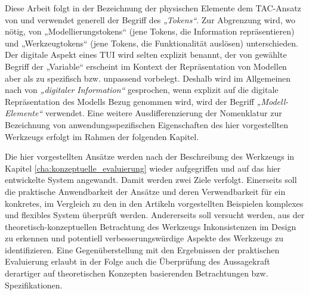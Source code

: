 % 	

Diese Arbeit folgt in der Bezeichnung der physischen Elemente dem TAC-Ansatz von \citep{Shaer04} und verwendet generell der Begriff des \emph{„Tokens“}. Zur Abgrenzung wird, wo nötig, von „Modellierungstokens“ (jene Tokens, die Information repräsentieren) und „Werkzeugtokens“ (jene Tokens, die Funktionalität auslösen) unterschieden. Der digitale Aspekt eines \gls{TUI} wird selten explizit benannt, der von \citep{Shaer04} gewählte Begriff der „Variable“ erscheint im Kontext der Repräsentation von Modellen aber als zu spezifisch bzw. unpassend vorbelegt. Deshalb wird im Allgemeinen nach \citep{Ishii08} von \emph{„digitaler Information“} gesprochen, wenn explizit auf die digitale Repräsentation des Modells Bezug genommen wird, wird der Begriff \emph{„Modell-Elemente“} verwendet. Eine weitere Ausdifferenzierung der Nomenklatur zur Bezeichnung von anwendungsspezifischen Eigenschaften des hier vorgestellten Werkzeugs erfolgt im Rahmen der folgenden Kapitel.

Die hier vorgestellten Ansätze werden nach der Beschreibung des Werkzeugs in Kapitel \ref{cha:konzeptuelle_evaluierung} wieder aufgegriffen und auf das hier entwickelte System angewandt. Damit werden zwei Ziele verfolgt. Einerseits soll die praktische Anwendbarkeit der Ansätze und deren Verwendbarkeit für ein konkretes, im Vergleich zu den in den Artikeln vorgestellten Beispielen komplexes und flexibles System überprüft werden. Andererseits soll versucht werden, aus der theoretisch-konzeptuellen Betrachtung des Werkzeugs Inkonsistenzen im Design zu erkennen und potentiell verbesserungswürdige Aspekte des Werkzeugs zu identifizieren. Eine Gegenüberstellung mit den Ergebnissen der praktischen Evaluierung erlaubt in der Folge auch die Überprüfung des Aussagekraft derartiger auf theoretischen Konzepten basierenden Betrachtungen bzw. Spezifikationen.


